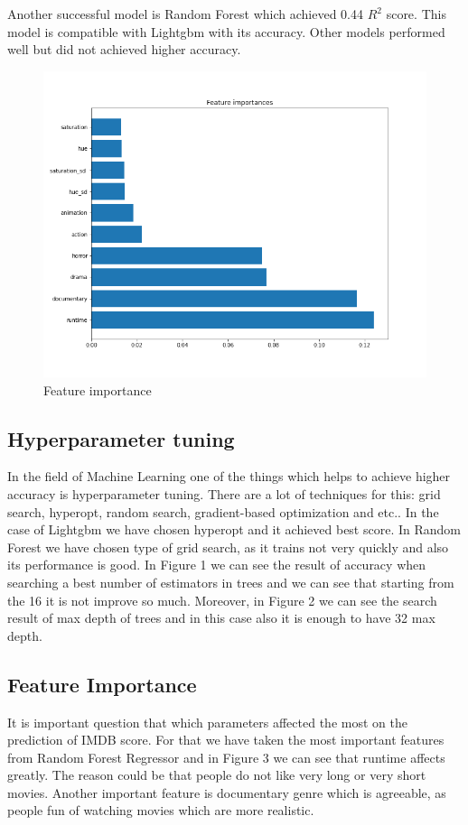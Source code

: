 \documentclass{article}
\begin{document}
Another successful model is Random Forest which achieved 0.44 $R^2$ score. This model is compatible with Lightgbm with its accuracy. Other models performed well but did not achieved higher accuracy. 

\begin{figure}
	\centering
	\includegraphics[width=1\linewidth, height=0.2\textheight, keepaspectratio]{../plots/feature_importancvce.png}
	\caption{Feature importance}
	\label{fig:feature_imp}
\end{figure}

\subsection{Hyperparameter tuning}
In the field of Machine Learning one of the things which helps to achieve higher accuracy is hyperparameter tuning. There are a lot of techniques  for this: grid search, hyperopt, random search, gradient-based optimization and etc.. In the case of Lightgbm we have chosen hyperopt and it achieved best score. In Random Forest we have chosen type of grid search, as it trains not very quickly and also its performance is good. In Figure 1 we can see the result of accuracy when searching a best number of estimators in trees and we can see that starting from the 16 it is not improve so much. Moreover, in Figure 2 we can see the search result of max depth of trees and in this case also it is enough to have 32 max depth. 

\subsection{Feature Importance}
It is important question that which parameters affected the most on the prediction of IMDB score. For that we have taken the most important features from Random Forest Regressor and in Figure 3 we can see that runtime affects greatly. The reason could be that people do not like very long or very short movies. Another important feature is documentary genre which is agreeable, as people fun of watching movies which are more realistic. 
\end{document}
